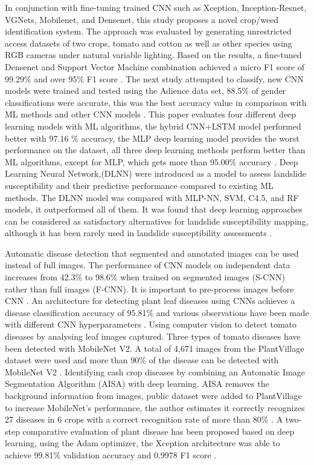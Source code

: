 \documentclass[conference]{IEEEtran}
\begin{document}
In conjunction with fine-tuning trained CNN such as Xception, Inception-Resnet, VGNets, Mobilenet, and Densenet, this study proposes a novel crop/weed identification system. The approach was evaluated by generating unrestricted access datasets of two crops, tomato and cotton as well as other species using RGB cameras under natural variable lighting. Based on the results, a fine-tuned Densenet and Support Vector Machine combination achieved a micro F1 score of 99.29\% and over 95\% F1 score \cite{espejo2020towards}. The next study attempted to classify, new CNN models were trained and tested using the Adience data set, 88.5\% of gender classifications were accurate, this was the best accuracy value in comparison with ML methods and other CNN models \cite{inik2018gender}.
This paper evaluates four different deep learning models with ML algorithms, the hybrid CNN+LSTM model performed better with 97.16 \% accuracy, the MLP deep learning model provides the worst performance on the dataset, all three deep learning methods perform better than ML algorithms, except for MLP, which gets more than 95.00\% accuracy \cite{roopak2019deep}. Deep Learning Neural Network,(DLNN) were introduced as a model to assess landslide susceptibility and their predictive performance compared to existing ML methods. The DLNN model was compared with MLP-NN, SVM, C4.5, and RF models, it outperformed all of them. It was found that deep learning approaches can be considered as satisfactory alternatives for landslide susceptibility mapping, although it has been rarely used in landslide susceptibility assessments \cite{bui2020comparing}.\

Automatic disease detection that segmented and annotated images can be used instead of full images. The performance of CNN models on independent data increases from 42.3\% to 98.6\% when trained on segmented images (S-CNN) rather than full images (F-CNN). It is important to pre-process images before CNN \cite{sharma2020performance}. An architecture for detecting plant leaf diseases using CNNs achieves a disease classification accuracy of 95.81\% and various observations have been made with different CNN hyperparameters \cite{zaki2020classification}. Using computer vision to detect tomato diseases by analysing leaf images captured. Three types of tomato diseases have been detected with MobileNet V2. A total of 4,671 images from the PlantVillage dataset were used and more than 90\% of the disease can be detected with MobileNet V2 \cite{xiong2020identification}.
Identifying cash crop diseases by combining an Automatic Image Segmentation Algorithm (AISA) with deep learning. AISA removes the background information from images, public dataset were added to PlantVillage to increase MobileNet's performance, the author estimates it correctly recognizes 27 diseases in 6 crops with a correct recognition rate of more than 80\% \cite{saleem2020plant}. A two-step comparative evaluation of plant disease has been proposed based on deep learning, using the Adam optimizer, the Xception architecture was able to achieve 99.81\% validation accuracy and 0.9978 F1 score \cite{mallouh2019utilizing}.
\end{document}
